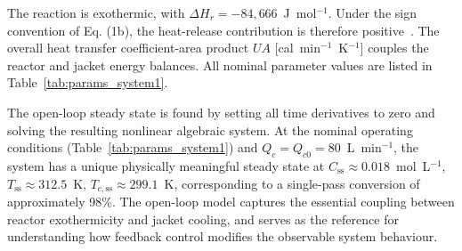 \documentclass[aps,pre,twocolumn,superscriptaddress,floatfix]{revtex4-2}
\begin{document}
The reaction is exothermic, with $\Delta H_r = -84{,}666$~J~mol$^{-1}$. Under the sign convention of Eq. (1b), the heat-release contribution is therefore positive~\citep{Fogler2016,Ziyai2022,NIST_WebBook}. 
The overall heat transfer coefficient-area product $U\!A$ [cal~min$^{-1}$~K$^{-1}$] couples the reactor and jacket energy balances. All nominal parameter values are listed in Table~\ref{tab:params_system1}.

The open-loop steady state is found by setting all time derivatives to zero and solving the resulting nonlinear algebraic system.  At the
nominal operating conditions (Table~\ref{tab:params_system1}) and $Q_c = Q_{c0} = 80$~L~min$^{-1}$, the system has a unique physically
meaningful steady state at
$C_\mathrm{ss} \approx 0.018$~mol~L$^{-1}$,
$T_\mathrm{ss} \approx 312.5$~K,
$T_{c,\mathrm{ss}} \approx 299.1$~K,
corresponding to a single-pass conversion of approximately 98\%. The open-loop model captures the essential coupling between reactor exothermicity and jacket cooling, and serves as the reference for understanding how feedback control modifies the observable system behaviour.
\end{document}
